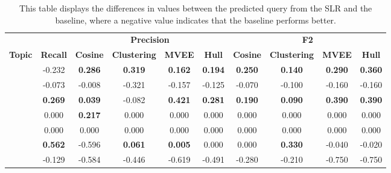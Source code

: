\begin{table}
	\caption{This table displays the differences in values between the predicted query from the SLR and the baseline, where a negative value indicates that the baseline performs better.}
	\tiny
	\centering
	\hspace*{-1cm}
	\begin{tabular}{p{3cm}c|cccc|cccc}
		& & \multicolumn{4}{c|}{\textbf{Precision}} & \multicolumn{4}{c}{\textbf{F2}} \\ \cline{1-10}
		\multicolumn{1}{c}{\centering \textbf{Topic}} &
		\multicolumn{1}{p{1cm}|}{\centering \textbf{Recall}} &
		\multicolumn{1}{p{0.8cm}}{\centering \textbf{Cosine}} &
		\multicolumn{1}{p{1.2cm}}{\centering \textbf{Clustering}} & 
		\multicolumn{1}{p{0.8cm}}{\centering \textbf{MVEE}} & 
		\multicolumn{1}{p{0.8cm}|}{\centering \textbf{Hull}} & 
		\multicolumn{1}{p{0.8cm}}{\centering \textbf{Cosine}} & 
		\multicolumn{1}{p{1.2cm}}{\centering \textbf{Clustering}} & 
		\multicolumn{1}{p{0.8cm}}{\centering \textbf{MVEE}}  & 
		\multicolumn{1}{p{0.8cm}}{\centering \textbf{Hull}}  \\ \hline 
		\centering{Software Process Line} &  -0.232 & \textbf{0.286} & \textbf{0.319} & \textbf{0.162} & \textbf{0.194} & \textbf{0.250} & \textbf{0.140} & \textbf{0.290} & \textbf{0.360} \\
		\centering{Data Stream Processing Latency} &  -0.073 &  -0.008 &  -0.321 &  -0.157 &  -0.125 &  -0.070 &  -0.100 &  -0.160 &  -0.160 \\
		\centering{Business Process Meta Models} & \textbf{0.269} & \textbf{0.039} &  -0.082 & \textbf{0.421} & \textbf{0.281} & \textbf{0.190} & \textbf{0.090} & \textbf{0.390} & \textbf{0.390} \\
		\centering{Multicore Performance Prediction} & 0.000 & \textbf{0.217} & 0.000 & 0.000 & 0.000 & 0.000 & 0.000 & 0.000 & 0.000 \\
		\centering{Cloud Migration} & 0.000 & 0.000 & 0.000 & 0.000 & 0.000 & 0.000 & 0.000 & 0.000 & 0.000 \\
		\centering{Software Fault Prediction Metrics} & \textbf{0.562} &  -0.596 & \textbf{0.061} & \textbf{0.005} & 0.000 & 0.000 & \textbf{0.330} &  -0.040 &  -0.020 \\
		\centering{Software Defect Prediction} &  -0.129 &  -0.584 &  -0.446 &  -0.619 &  -0.491 &  -0.280 &  -0.210 &  -0.750 &  -0.750 \\
	\end{tabular}\label{table:expirment-2}
\end{table}

